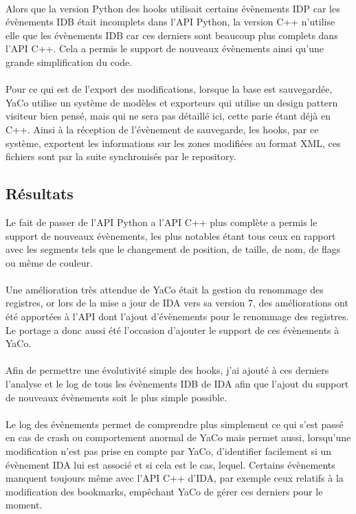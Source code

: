 \documentclass[11pt, book, english, french, standardlists]{upmethodology-document}
\begin{document}
				\paragraph*{}
					Alors que la version Python des hooks utilisait certains évènements IDP car les évènements IDB était incomplets dans l'\gls{API} Python, la version C++ n'utilise elle que les évènements IDB car ces derniers sont beaucoup plus complets dans l'\gls{API} C++. Cela a permis le support de nouveaux évènements ainsi qu'une grande simplification du code.
				\paragraph*{}
					Pour ce qui est de l'export des modifications, lorsque la base est sauvegardée, YaCo utilise un système de modèles et exporteurs qui utilise un design pattern visiteur bien pensé, mais qui ne sera pas détaillé ici, cette parie étant déjà en C++. Ainsi à la réception de l'évènement de sauvegarde, les hooks, par ce système, exportent les informations sur les zones modifiées au format \gls{XML}, ces fichiers sont par la suite synchronisés par le repository.
			\subsection{Résultats}
					Le fait de passer de l'\gls{API} Python a l'\gls{API} C++ plus complète a permis le support de nouveaux évènements, les plus notables étant tous ceux en rapport avec les segments tels que le changement de position, de taille, de nom, de flags ou même de couleur.
				\paragraph*{}
					Une amélioration très attendue de YaCo était la gestion du renommage des registres, or lors de la mise a jour de IDA vers sa version 7, des améliorations ont été apportées à l'\gls{API} dont l'ajout d'évènements pour le renommage des registres. Le portage a donc aussi été l'occasion d'ajouter le support de ces évènements à YaCo.
				\paragraph*{}
					Afin de permettre une évolutivité simple des hooks, j'ai ajouté à ces derniers l'analyse et le log de tous les évènements IDB de IDA afin que l'ajout du support de nouveaux évènements soit le plus simple possible.
				\paragraph*{}
					Le log des évènements permet de comprendre plus simplement ce qui s'est passé en cas de crash ou comportement anormal de YaCo mais permet aussi, lorsqu'une modification n'est pas prise en compte par YaCo, d'identifier facilement si un évènement IDA lui est associé et si cela est le cas, lequel.
					Certains évènements manquent toujours même avec l'\gls{API} C++ d'IDA, par exemple ceux relatifs à la modification des bookmarks, empêchant YaCo de gérer ces derniers pour le moment.
\end{document}
